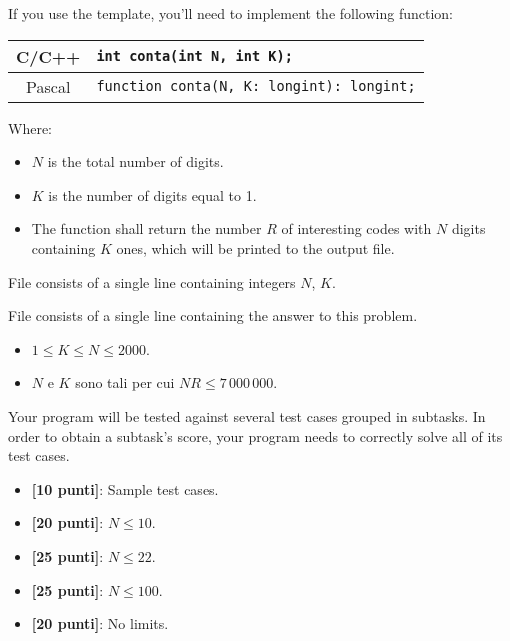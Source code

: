 If you use the template, you'll need to implement the following function:
\begin{center}\begin{tabularx}{\textwidth}{|c|X|}
\hline
C/C++  & \verb|int conta(int N, int K);|\\
\hline
Pascal & \verb|function conta(N, K: longint): longint;|\\
\hline
\end{tabularx}\end{center}
Where:
\begin{itemize}[nolistsep]
  \item $N$ is the total number of digits.
  \item $K$ is the number of digits equal to 1.
  \item The function shall return the number $R$ of interesting codes with $N$ digits containing $K$ ones, which will be printed to the output file.
\end{itemize}

\InputFile
File  consists of a single line containing integers $N$, $K$.

\OutputFile
File \outputfile{} consists of a single line containing the answer to this problem.

\Constraints
\begin{itemize}[nolistsep, itemsep=2mm]
	\item $1 \le K \le N \le 2000$.
	\item $N$ e $K$ sono tali per cui $NR \le 7\,000\,000$.
\end{itemize}

\Scoring
Your program will be tested against several test cases grouped in subtasks.
In order to obtain a subtask's score, your program needs to correctly solve all of its test cases.

\begin{itemize}[nolistsep,itemsep=2mm]
  \item \textbf{ [10 punti]}: Sample test cases.
  \item \textbf{ [20 punti]}: $N \leq 10$.
  \item \textbf{ [25 punti]}: $N \leq 22$.
  \item \textbf{ [25 punti]}: $N \leq 100$.
  \item \textbf{ [20 punti]}: No limits.
\end{itemize}


